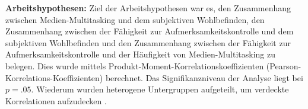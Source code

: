 \par
\textbf{Arbeitshypothesen:} Ziel der Arbeitshypothesen war es, den Zusammenhang zwischen Medien-Multitasking und dem subjektiven Wohlbefinden, den Zusammenhang zwischen der Fähigkeit zur Aufmerksamkeitskontrolle und dem subjektiven Wohlbefinden und den Zusammenhang zwischen der Fähigkeit zur Aufmerksamkeitskontrolle und der Häufigkeit von Medien-Multitasking zu belegen. Dies wurde mittels Produkt-Moment-Korrelationskoeffizienten (Pearson-Korrelations-Koeffizienten) berechnet. Das Signifikanzniveau der Analyse liegt bei $p=.05$. Wiederum wurden heterogene Untergruppen aufgeteilt, um verdeckte Korrelationen aufzudecken \cite{Ebermann2014}.


